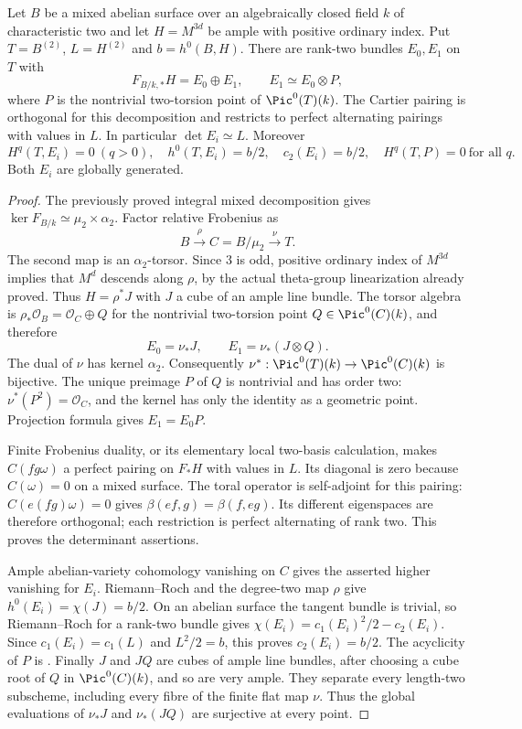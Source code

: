 \begin{lemma}
\label{lem:DE-A3-positive-two-bundles}
Let $B$ be a mixed abelian surface over an algebraically closed
field $k$ of characteristic two and let
$H=M^{3d}$ be ample with positive ordinary index. Put
$T=B^{(2)}$, $L=H^{(2)}$ and $b=h^0(B,H)$.
There are rank-two bundles $E_0,E_1$ on $T$ with
\[
 F_{B/k,*}H=E_0\oplus E_1,\qquad
 E_1\simeq E_0\otimes P,
\]
where $P$ is the nontrivial two-torsion point of $\Pic^0(T)(k)$.
The Cartier pairing is orthogonal for this decomposition and
restricts to perfect alternating pairings with values in $L$.
In particular $\det E_i\simeq L$. Moreover
\[
 H^q(T,E_i)=0\ (q>0),\quad h^0(T,E_i)=b/2,\quad
 c_2(E_i)=b/2,\quad H^q(T,P)=0\ \text{for all }q.
\]
Both $E_i$ are globally generated.
\end{lemma}
\begin{proof}
The previously proved integral mixed decomposition gives
$\ker F_{B/k}\simeq\mu_2\times\alpha_2$.
Factor relative Frobenius as
\[
 B\xrightarrow{\rho}C=B/\mu_2\xrightarrow{\nu}T.
\]
The second map is an $\alpha_2$-torsor.
Since $3$ is odd, positive ordinary index of $M^{3d}$ implies
that $M^d$ descends along $\rho$, by the actual theta-group
linearization already proved. Thus $H=\rho^*J$ with $J$ a
cube of an ample line bundle. The torsor algebra is
$\rho_*\mathcal O_B=\mathcal O_C\oplus Q$ for the nontrivial
two-torsion point $Q\in\Pic^0(C)(k)$, and therefore
\[
 E_0=\nu_*J,\qquad E_1=\nu_*(J\otimes Q).
\]
The dual of $\nu$ has kernel $\alpha_2$. Consequently
$\nu^*: \Pic^0(T)(k)\to\Pic^0(C)(k)$ is bijective.
The unique preimage $P$ of $Q$ is nontrivial and has order two:
$\nu^*(P^2)=\mathcal O_C$, and the kernel has only the identity
as a geometric point. Projection formula gives $E_1=E_0P$.

Finite Frobenius duality, or its elementary local two-basis
calculation, makes $C(fg\omega)$ a perfect pairing on $F_*H$
with values in $L$. Its diagonal is zero because
$C(\omega)=0$ on a mixed surface.
The toral operator is self-adjoint for this pairing:
$C(e(fg)\omega)=0$ gives $\beta(ef,g)=\beta(f,eg)$.
Its different eigenspaces are therefore orthogonal; each
restriction is perfect alternating of rank two. This proves
the determinant assertions.

Ample abelian-variety cohomology vanishing on $C$ gives the
asserted higher vanishing for $E_i$. Riemann--Roch and the
degree-two map $\rho$ give $h^0(E_i)=\chi(J)=b/2$.
On an abelian surface the tangent bundle is trivial, so
Riemann--Roch for a rank-two bundle gives
$\chi(E_i)=c_1(E_i)^2/2-c_2(E_i)$. Since $c_1(E_i)=c_1(L)$
and $L^2/2=b$, this proves $c_2(E_i)=b/2$.
The acyclicity of $P$ is
\cite[Lemma~7.19 and its full proof, p.~105]
{EdixhovenVanDerGeerMoonenAV}.
Finally $J$ and $JQ$ are cubes of ample line bundles, after
choosing a cube root of $Q$ in $\Pic^0(C)(k)$, and so are
very ample. They separate every length-two subscheme,
including every fibre of the finite flat map $\nu$.
Thus the global evaluations of $\nu_*J$ and $\nu_*(JQ)$
are surjective at every point.
\end{proof}

